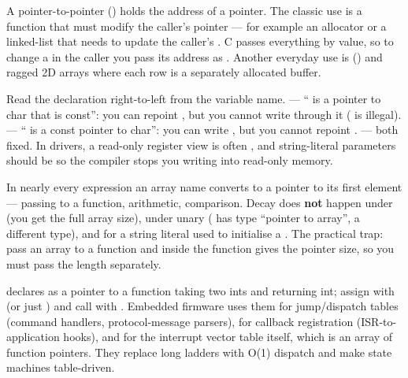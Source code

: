 A pointer-to-pointer () holds the address of a pointer. The
classic use is a function that must modify the caller's pointer --- for
example an allocator or a linked-list  that needs to update the
caller's . C passes everything by value, so to change a
 in the caller you pass its address as . Another
everyday use is  () and ragged 2D arrays where
each row is a separately allocated buffer.

Read the declaration right-to-left from the variable name.
 --- `` is a pointer to char that is const'': you
can repoint , but you cannot write through it ( is
illegal).  --- `` is a const pointer to char'':
you can write , but you cannot repoint .
 --- both fixed. In drivers, a read-only register
view is often , and string-literal
parameters should be  so the compiler stops you writing
into read-only memory.

In nearly every expression an array name converts to a pointer to its first
element --- passing to a function, arithmetic, comparison. Decay does
\textbf{not} happen under  (you get the full array size), under
unary \code{\&} ( has type ``pointer to array'', a different
type), and for a string literal used to initialise a . The
practical trap: pass an array to a function and  inside the
function gives the pointer size, so you must pass the length separately.

 declares  as a pointer to a function
taking two ints and returning int; assign with  (or just
) and call with . Embedded firmware uses them for
jump/dispatch tables (command handlers, protocol-message parsers), for
callback registration (ISR-to-application hooks), and for the interrupt
vector table itself, which is an array of function pointers. They replace
long  ladders with O(1) dispatch and make state machines
table-driven.

